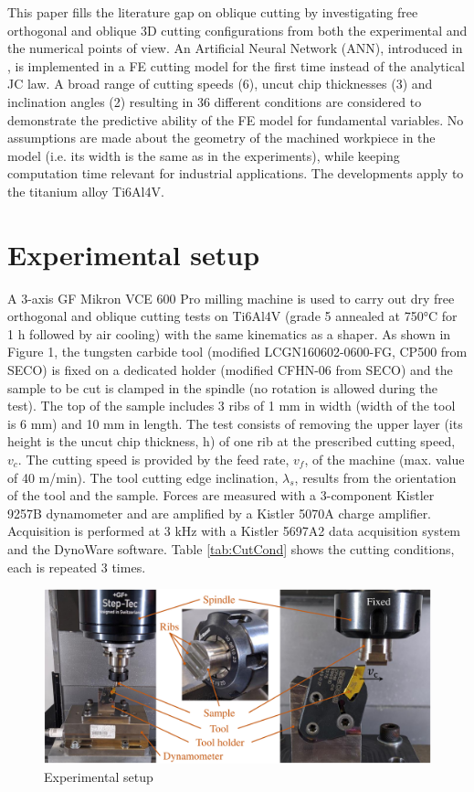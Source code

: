 \documentclass[final,5p,times,twocolumn]{elsarticle}
\begin{document}
This paper fills the literature gap on oblique cutting by investigating free orthogonal and oblique 3D cutting configurations from both the experimental and the numerical points of view. An Artificial Neural Network (ANN), introduced in \cite{pantale_efficient_2022}, is implemented in a FE cutting model for the first time instead of the analytical JC law. A broad range of cutting speeds (6), uncut chip thicknesses (3) and inclination angles (2) resulting in 36 different conditions are considered to demonstrate the predictive ability of the FE model for fundamental variables. No assumptions are made about the geometry of the machined workpiece in the model (i.e. its width is the same as in the experiments), while keeping computation time relevant for industrial applications. The developments apply to the titanium alloy Ti6Al4V.

\section{Experimental setup}
\label{ExpSet}

A 3-axis GF Mikron VCE 600 Pro milling machine is used to carry out dry free orthogonal and oblique cutting tests on Ti6Al4V (grade 5 annealed at 750°C for 1 h followed by air cooling) with the same kinematics as a shaper. As shown in Figure 1, the tungsten carbide tool (modified LCGN160602-0600-FG, CP500 from SECO) is fixed on a dedicated holder (modified CFHN-06 from SECO) and the sample to be cut is clamped in the spindle (no rotation is allowed during the test). The top of the sample includes 3 ribs of 1 mm in width (width of the tool is 6 mm) and 10 mm in length. The test consists of removing the upper layer (its height is the uncut chip thickness, h) of one rib at the prescribed cutting speed, $v_c$. The cutting speed is provided by the feed rate, $v_f$, of the machine (max. value of 40 m/min). The tool cutting edge inclination, $\lambda_s$, results from the orientation of the tool and the sample. Forces are measured with a 3-component Kistler 9257B dynamometer and are amplified by a Kistler 5070A charge amplifier. Acquisition is performed at 3 kHz with a Kistler 5697A2 data acquisition system and the DynoWare software. Table \ref{tab:CutCond} shows the cutting conditions, each is repeated 3 times.

\begin{figure}[h]
\centering
\includegraphics{Figures/ExpSetup}
\caption{Experimental setup}
\label{ExpSetup}
\end{figure}
\end{document}
